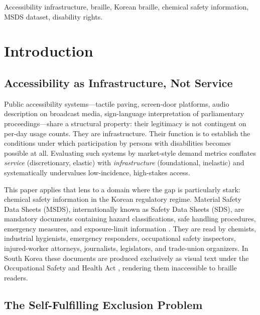 \documentclass[journal]{IEEEtran}
\begin{document}
\begin{keywords}
Accessibility infrastructure, braille, Korean braille, chemical safety information, MSDS dataset, disability rights.
\end{keywords}

\titlepgskip=-15pt

\maketitle

\section{Introduction}
\label{sec:introduction}

\subsection{Accessibility as Infrastructure, Not Service}

Public accessibility systems---tactile paving, screen-door platforms, audio description on broadcast media, sign-language interpretation of parliamentary proceedings---share a structural property: their legitimacy is not contingent on per-day usage counts. They are infrastructure. Their function is to establish the conditions under which participation by persons with disabilities becomes possible at all. Evaluating such systems by market-style demand metrics conflates \emph{service} (discretionary, elastic) with \emph{infrastructure} (foundational, inelastic) and systematically undervalues low-incidence, high-stakes access.

This paper applies that lens to a domain where the gap is particularly stark: chemical safety information in the Korean regulatory regime. Material Safety Data Sheets (MSDS), internationally known as Safety Data Sheets (SDS), are mandatory documents containing hazard classifications, safe handling procedures, emergency measures, and exposure-limit information \cite{kosha_act}. They are read by chemists, industrial hygienists, emergency responders, occupational safety inspectors, injured-worker attorneys, journalists, legislators, and trade-union organizers. In South Korea these documents are produced exclusively as visual text under the Occupational Safety and Health Act \cite{kosha_act}, rendering them inaccessible to braille readers.

\subsection{The Self-Fulfilling Exclusion Problem}
\end{document}
